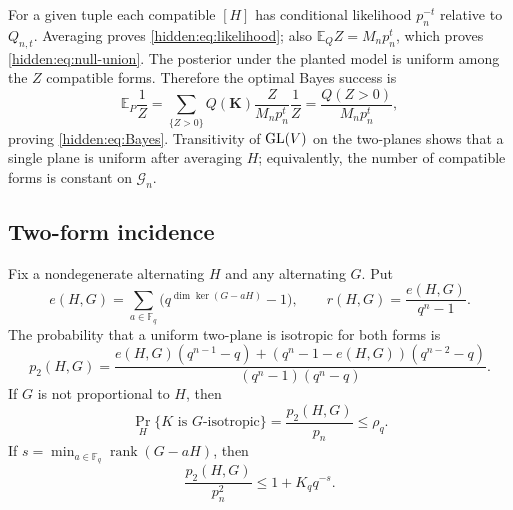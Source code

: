 For a given tuple each compatible $[H]$ has conditional likelihood
$p_n^{-t}$ relative to $Q_{n,t}$. Averaging proves
\eqref{hidden:eq:likelihood}; also $\mathbb E_Q Z=M_np_n^t$, which proves
\eqref{hidden:eq:null-union}. The posterior under the planted model is
uniform among the $Z$ compatible forms. Therefore the optimal Bayes
success is
\[
 \mathbb E_P\frac1Z
 =\sum_{\{Z>0\}}Q(\boldsymbol K)\frac{Z}{M_np_n^t}\frac1Z
 =\frac{Q(Z>0)}{M_np_n^t},
\]
proving \eqref{hidden:eq:Bayes}. Transitivity of $\operatorname{GL}(V)$ on the
two-planes shows that a single plane is uniform after averaging $H$;
equivalently, the number of compatible forms is constant on $\mathcal G_n$.

\subsection{Two-form incidence}

\begin{lemma}\label{hidden:lem:pair}
Fix a nondegenerate alternating $H$ and any alternating $G$. Put
\[
 e(H,G)=\sum_{a\in\mathbb F_q}
    \bigl(q^{\dim\ker(G-aH)}-1\bigr),\qquad
 r(H,G)=\frac{e(H,G)}{q^n-1}.
\]
The probability that a uniform two-plane is isotropic for both forms is
\begin{equation}\label{hidden:eq:pair}
 p_2(H,G)=
 \frac{e(H,G)(q^{n-1}-q)+(q^n-1-e(H,G))(q^{n-2}-q)}
 {(q^n-1)(q^n-q)}.
\end{equation}
If $G$ is not proportional to $H$, then
\begin{equation}\label{hidden:eq:rho}
 \Pr_H\{K\text{ is }G\text{-isotropic}\}
       =\frac{p_2(H,G)}{p_n}\le\rho_q.
\end{equation}
If $s=\min_{a\in\mathbb F_q}\operatorname{rank}(G-aH)$, then
\begin{equation}\label{hidden:eq:far}
 \frac{p_2(H,G)}{p_n^2}\le1+K_q q^{-s}.
\end{equation}
\end{lemma}

